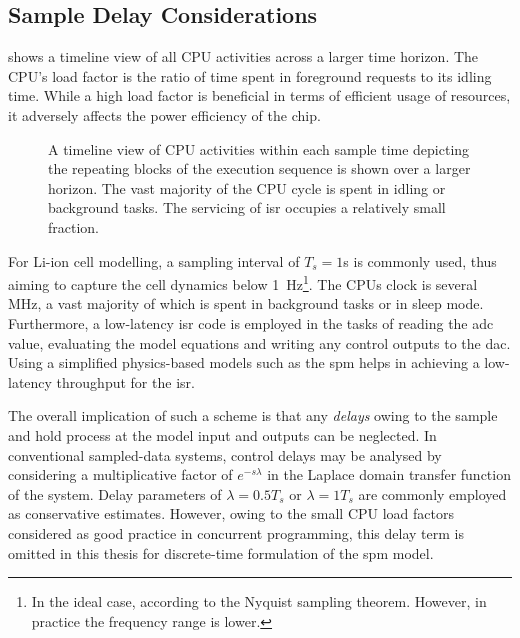 \subsection{Sample Delay Considerations}

 shows a timeline view of all CPU activities across
a larger  time horizon.  The CPU's  load factor is  the ratio  of time  spent in
foreground requests to  its idling time. While a high  load factor is beneficial
in  terms of  efficient  usage  of resources,  it  adversely  affects the  power
efficiency of the chip.

\begin{figure}[!htbp]
    \centering
    \hrulefill
    \caption[Timeline of  activities over multiple CPU cycles of a real-time
    controller]{A timeline view of CPU activities within each sample time
        depicting the repeating blocks of the execution sequence is shown over a
        larger horizon. The vast majority of the CPU cycle is spent in idling or
    background tasks. The servicing of \gls{isr} occupies a relatively small fraction.}
    \label{fig:timingdiagramSmall}
\end{figure}

For  Li-ion  cell  modelling,  a  sampling interval  of  $T_s  =  1$\si{\second}
is   commonly  used,   thus  aiming   to   capture  the   cell  dynamics   below
\SI{1}{\hertz}\footnote{In  the ideal  case, according  to the  Nyquist sampling
theorem. However, in practice the frequency  range is lower.}. The CPUs clock is
several \si{\MHz}, a vast  majority of which is spent in  background tasks or in
sleep mode. Furthermore,  a low-latency \gls{isr} code is employed  in the tasks
of reading the  \gls{adc} value, evaluating the model equations  and writing any
control outputs to  the \gls{dac}. Using a simplified  physics-based models such
as the \gls{spm} helps in achieving a low-latency throughput for the \gls{isr}.

The overall implication of such a scheme  is that any \emph{delays} owing to the
sample and  hold process  at the model  input and outputs  can be  neglected. In
conventional sampled-data systems, control delays may be analysed by considering
a multiplicative factor of $e^{-sλ}$ in the Laplace domain transfer function of
the system.  Delay parameters of  $λ = 0.5  T_s$ or $λ  = 1 T_s$  are commonly
employed as conservative estimates. However, owing to the small CPU load factors
considered  as good  practice  in  concurrent programming,  this  delay term  is
omitted in this thesis for discrete-time formulation of the \gls{spm} model.


